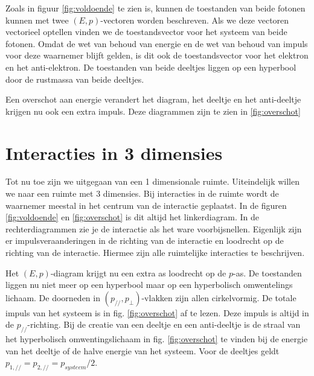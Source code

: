 Zoals in figuur \ref{fig:voldoende} te zien is, kunnen de toestanden van beide fotonen kunnen met twee $\left(E, p\right)$-vectoren worden beschreven. Als we deze vectoren vectorieel optellen
vinden we de toestandsvector voor het systeem van beide fotonen. Omdat
de wet van behoud van energie en de wet van behoud van impuls voor
deze waarnemer blijft gelden, is dit ook de toestandsvector voor het
elektron en het anti-elektron. De toestanden van beide deeltjes liggen
op een hyperbool door de rustmassa van beide deeltjes. 


Een overschot aan energie verandert het diagram, het deeltje en het anti-deeltje krijgen nu ook een extra impuls. Deze diagrammen zijn te zien in \ref{fig:overschot}


\section{Interacties in 3 dimensies}

Tot nu toe zijn we uitgegaan van een 1 dimensionale ruimte. Uiteindelijk willen we naar een ruimte met 3 dimensies. Bij interacties in de ruimte wordt de waarnemer meestal in het centrum van de interactie geplaatst. In de figuren \ref{fig:voldoende} en \ref{fig:overschot} is dit altijd het linkerdiagram. In de rechterdiagrammen zie je de interactie als het ware voorbijsnellen. Eigenlijk zijn er impulsveraanderingen in de richting van de interactie en loodrecht op de richting van de interactie. Hiermee zijn alle ruimtelijke interacties te beschrijven.

Het $(E,p)$-diagram krijgt nu een extra as loodrecht op de $p$-as. De toestanden liggen nu niet meer op een hyperbool maar op een hyperbolisch omwentelings lichaam. De doorneden in $\left(p_{//},p_{\perp}\right)$-vlakken zijn allen cirkelvormig. De totale impuls van het systeem is in fig. \ref{fig:overschot} af te lezen. Deze impuls is altijd in de $p_{//}$-richting. Bij de creatie van een deeltje en een anti-deeltje is de straal van het hyperbolisch omwentingslichaam in fig. \ref{fig:overschot} te vinden bij de energie van het deeltje of de halve energie van het systeem. Voor de deeltjes geldt $p_{1,//}=p_{2,//}=p_{systeem}/2$.

